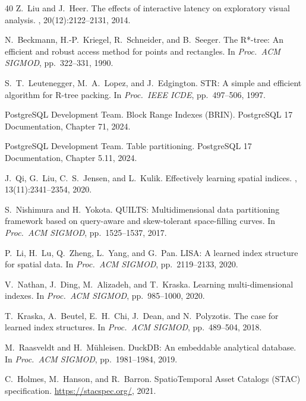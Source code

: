 \documentclass[sigconf]{acmart}
\begin{document}
\begin{thebibliography}{40}
Z.~Liu and J.~Heer.
\newblock The effects of interactive latency on exploratory visual analysis.
, 20(12):2122--2131, 2014.

N.~Beckmann, H.-P.~Kriegel, R.~Schneider, and B.~Seeger.
\newblock The R*-tree: An efficient and robust access method for points and rectangles.
\newblock In {\em Proc.\ ACM SIGMOD}, pp.~322--331, 1990.

S.~T.~Leutenegger, M.~A.~Lopez, and J.~Edgington.
\newblock STR: A simple and efficient algorithm for R-tree packing.
\newblock In {\em Proc.\ IEEE ICDE}, pp.~497--506, 1997.

PostgreSQL Development Team.
\newblock Block Range Indexes (BRIN).
\newblock PostgreSQL 17 Documentation, Chapter 71, 2024.

PostgreSQL Development Team.
\newblock Table partitioning.
\newblock PostgreSQL 17 Documentation, Chapter 5.11, 2024.

J.~Qi, G.~Liu, C.~S.~Jensen, and L.~Kulik.
\newblock Effectively learning spatial indices.
, 13(11):2341--2354, 2020.

S.~Nishimura and H.~Yokota.
\newblock QUILTS: Multidimensional data partitioning framework based on query-aware and skew-tolerant space-filling curves.
\newblock In {\em Proc.\ ACM SIGMOD}, pp.~1525--1537, 2017.

P.~Li, H.~Lu, Q.~Zheng, L.~Yang, and G.~Pan.
\newblock LISA: A learned index structure for spatial data.
\newblock In {\em Proc.\ ACM SIGMOD}, pp.~2119--2133, 2020.

V.~Nathan, J.~Ding, M.~Alizadeh, and T.~Kraska.
\newblock Learning multi-dimensional indexes.
\newblock In {\em Proc.\ ACM SIGMOD}, pp.~985--1000, 2020.

T.~Kraska, A.~Beutel, E.~H.~Chi, J.~Dean, and N.~Polyzotis.
\newblock The case for learned index structures.
\newblock In {\em Proc.\ ACM SIGMOD}, pp.~489--504, 2018.

M.~Raasveldt and H.~M\"uhleisen.
\newblock DuckDB: An embeddable analytical database.
\newblock In {\em Proc.\ ACM SIGMOD}, pp.~1981--1984, 2019.

C.~Holmes, M.~Hanson, and R.~Barron.
\newblock SpatioTemporal Asset Catalogs (STAC) specification.
\newblock \url{https://stacspec.org/}, 2021.


\end{thebibliography}
\end{document}
